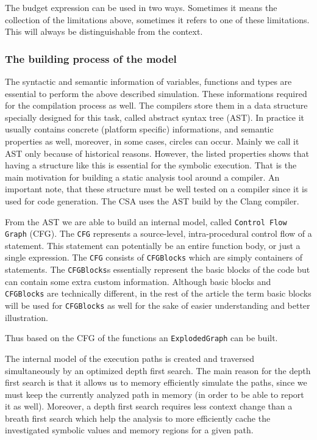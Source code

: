The budget expression can be used in two ways. Sometimes it means the
collection of the limitations above, sometimes it refers to one of these
limitations. This will always be distinguishable from the context.

\subsubsection{The building process of the model}
The syntactic and semantic information of variables, functions and types
are essential to perform the above described simulation. These informations 
required for the compilation process as well. The compilers store them in a 
data structure specially designed for this task, called abstract syntax tree 
(AST). In practice it usually contains concrete (platform specific) 
informations, and semantic properties as well, moreover, in some cases, circles 
can occur. Mainly we call it AST only because of historical reasons. 
However, the listed properties shows that having a structure like this is 
essential for the symbolic execution. That is the main motivation for building 
a static analysis tool around a compiler. An important note, that these 
structure must be well tested on a compiler since it is used for code 
generation. The CSA uses the AST build by the Clang compiler.

From the AST we are able to build an internal model, called \texttt{Control 
Flow 
Graph} (CFG). The \texttt{CFG} represents a source-level, intra-procedural 
control flow of a statement. This statement can potentially be an entire 
function body, or just a single expression. The \texttt{CFG} consists of 
\texttt{CFGBlocks} which are simply containers of statements. The 
\texttt{CFGBlocks}s essentially represent the basic blocks of the code but can 
contain some extra custom information. 
Although basic blocks and \texttt{CFGBlocks} are technically different, in the 
rest of the article the term basic blocks will be used for \texttt{CFGBlocks} 
as well for the sake of easier understanding and better illustration.

Thus based on the CFG of the functions an \texttt{ExplodedGraph} can be built.

The internal model of the execution paths is created and traversed 
simultaneously 
by an optimized depth first search. The main reason for the depth first search 
is that it allows us to memory efficiently simulate the paths, since we must 
keep the currently analyzed path in memory (in order to be able to report it as 
well). Moreover, a depth first search requires less context change than a 
breath first search which help the analysis to more efficiently cache the 
investigated symbolic values and memory regions for a given path.

